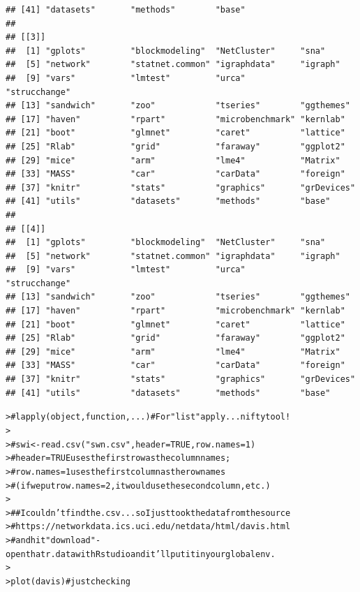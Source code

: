 \documentclass[12pt]{article}\usepackage[]{graphicx}\usepackage[]{color}
\makeatletter
\newcommand{\hlcom}[1]{\textcolor[rgb]{0.404,0.408,0.42}{#1}}%
\newcommand{\hlstd}[1]{\textcolor[rgb]{0.882,0.878,0.898}{#1}}%
\newcommand{\hlkwd}[1]{\textcolor[rgb]{0.733,0.388,0.812}{#1}}%
\newenvironment{kframe}{%
 \def\at@end@of@kframe{}%
 \ifinner\ifhmode%
  \def\at@end@of@kframe{\end{minipage}}%
  \begin{minipage}{\columnwidth}%
 \fi\fi%
 \def\FrameCommand##1{\hskip\@totalleftmargin \hskip-\fboxsep
 \colorbox{shadecolor}{##1}\hskip-\fboxsep
     \hskip-\linewidth \hskip-\@totalleftmargin \hskip\columnwidth}%
 \MakeFramed {\advance\hsize-\width
   \@totalleftmargin\z@ \linewidth\hsize
   \@setminipage}}%
 {\par\unskip\endMakeFramed%
 \at@end@of@kframe}
\newenvironment{knitrout}{}{} %
\makeatother
\begin{document}
\begin{flushleft}
\begin{center}
\begin{knitrout}
\begin{kframe}
\begin{verbatim}
## [41] "datasets"       "methods"        "base"          
## 
## [[3]]
##  [1] "gplots"         "blockmodeling"  "NetCluster"     "sna"           
##  [5] "network"        "statnet.common" "igraphdata"     "igraph"        
##  [9] "vars"           "lmtest"         "urca"           "strucchange"   
## [13] "sandwich"       "zoo"            "tseries"        "ggthemes"      
## [17] "haven"          "rpart"          "microbenchmark" "kernlab"       
## [21] "boot"           "glmnet"         "caret"          "lattice"       
## [25] "Rlab"           "grid"           "faraway"        "ggplot2"       
## [29] "mice"           "arm"            "lme4"           "Matrix"        
## [33] "MASS"           "car"            "carData"        "foreign"       
## [37] "knitr"          "stats"          "graphics"       "grDevices"     
## [41] "utils"          "datasets"       "methods"        "base"          
## 
## [[4]]
##  [1] "gplots"         "blockmodeling"  "NetCluster"     "sna"           
##  [5] "network"        "statnet.common" "igraphdata"     "igraph"        
##  [9] "vars"           "lmtest"         "urca"           "strucchange"   
## [13] "sandwich"       "zoo"            "tseries"        "ggthemes"      
## [17] "haven"          "rpart"          "microbenchmark" "kernlab"       
## [21] "boot"           "glmnet"         "caret"          "lattice"       
## [25] "Rlab"           "grid"           "faraway"        "ggplot2"       
## [29] "mice"           "arm"            "lme4"           "Matrix"        
## [33] "MASS"           "car"            "carData"        "foreign"       
## [37] "knitr"          "stats"          "graphics"       "grDevices"     
## [41] "utils"          "datasets"       "methods"        "base"
\end{verbatim}
\begin{alltt}
\hlstd{> }\hlcom{#  lapply(object, function, ...)  # For "list" apply... nifty tool!}
\hlstd{> }
\hlstd{> }\hlcom{# swi <- read.csv("swn.csv", header = TRUE, row.names = 1)}
\hlstd{> }\hlcom{# header = TRUE uses the first row as the column names;}
\hlstd{> }\hlcom{#  row.names = 1 uses the first column as the row names}
\hlstd{> }\hlcom{#    (if we put row.names = 2, it would use the second column, etc.)}
\hlstd{> }
\hlstd{> }\hlcom{## I couldn't find the .csv... so I just took the data from the source}
\hlstd{> }\hlcom{# https://networkdata.ics.uci.edu/netdata/html/davis.html}
\hlstd{> }\hlcom{#  and hit "download" - open that r.data with Rstudio and it'll put it in your global env.}
\hlstd{> }
\hlstd{> }\hlkwd{plot}\hlstd{(davis)} \hlcom{# just checking}
\end{alltt}



\end{kframe}
\end{knitrout}
\end{center}
\end{flushleft}
\end{document}
